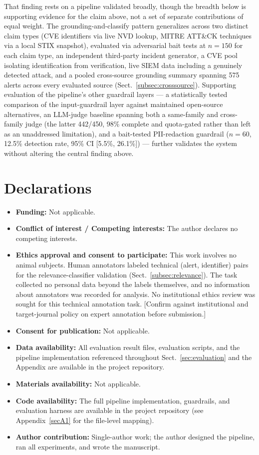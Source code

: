 \documentclass[pdflatex,sn-mathphys-num]{sn-jnl}%
\begin{document}
That finding rests on a pipeline validated broadly, though the breadth
below is supporting evidence for the claim above, not a set of separate
contributions of equal weight. The grounding-and-classify pattern
generalizes across two distinct claim types (CVE identifiers via live
NVD lookup, MITRE ATT\&CK techniques via a local STIX snapshot),
evaluated via adversarial bait tests at $n=150$ for each claim type, an
independent third-party incident generator, a CVE pool isolating
identification from verification, live SIEM data including a genuinely
detected attack, and a pooled cross-source grounding summary spanning
575 alerts across every evaluated source (Sect.~\ref{subsec:crosssource}).
Supporting evaluation of the pipeline's other guardrail layers --- a
statistically tested comparison of the input-guardrail layer against
maintained open-source alternatives, an LLM-judge baseline spanning both
a same-family and cross-family judge (the latter 442/450, 98\% complete
and quota-gated rather than left as an unaddressed limitation), and a
bait-tested PII-redaction guardrail ($n=60$, 12.5\% detection rate,
95\% CI [5.5\%, 26.1\%]) --- further validates the system without
altering the central finding above.

\backmatter

\section*{Declarations}

\begin{itemize}
\item \textbf{Funding:} Not applicable.
\item \textbf{Conflict of interest / Competing interests:} The author declares no competing interests.
\item \textbf{Ethics approval and consent to participate:} This work involves no animal subjects. Human annotators labeled technical (alert, identifier) pairs for the relevance-classifier validation (Sect.~\ref{subsec:relevance}). The task collected no personal data beyond the labels themselves, and no information about annotators was recorded for analysis. No institutional ethics review was sought for this technical annotation task. [Confirm against institutional and target-journal policy on expert annotation before submission.]
\item \textbf{Consent for publication:} Not applicable.
\item \textbf{Data availability:} All evaluation result files, evaluation scripts, and the pipeline implementation referenced throughout Sect.~\ref{sec:evaluation} and the Appendix are available in the project repository.
\item \textbf{Materials availability:} Not applicable.
\item \textbf{Code availability:} The full pipeline implementation, guardrails, and evaluation harness are available in the project repository (see Appendix~\ref{secA1} for the file-level mapping).
\item \textbf{Author contribution:} Single-author work; the author designed the pipeline, ran all experiments, and wrote the manuscript.
\end{itemize}
\end{document}
